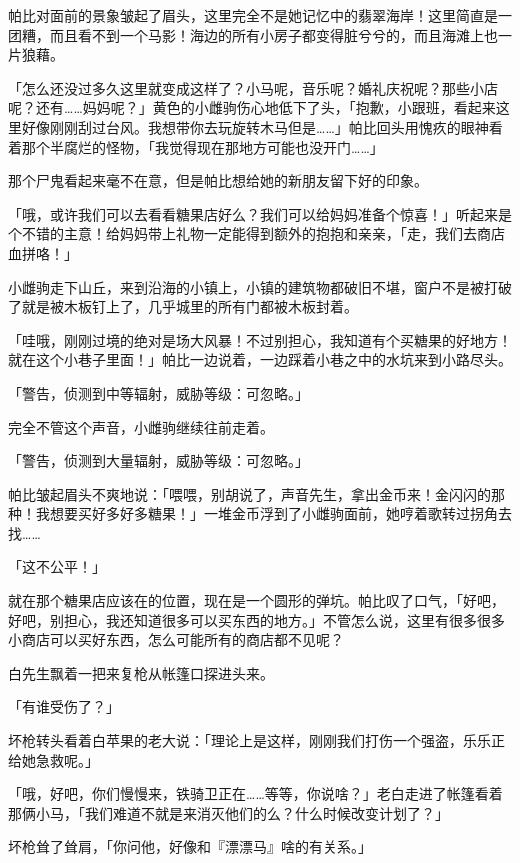 帕比对面前的景象皱起了眉头，这里完全不是她记忆中的翡翠海岸！这里简直是一团糟，而且看不到一个马影！海边的所有小房子都变得脏兮兮的，而且海滩上也一片狼藉。

「怎么还没过多久这里就变成这样了？小马呢，音乐呢？婚礼庆祝呢？那些小店呢？还有……妈妈呢？」黄色的小雌驹伤心地低下了头，「抱歉，小跟班，看起来这里好像刚刚刮过台风。我想带你去玩旋转木马但是……」帕比回头用愧疚的眼神看着那个半腐烂的怪物，「我觉得现在那地方可能也没开门……」

那个尸鬼看起来毫不在意，但是帕比想给她的新朋友留下好的印象。

「哦，或许我们可以去看看糖果店好么？我们可以给妈妈准备个惊喜！」听起来是个不错的主意！给妈妈带上礼物一定能得到额外的抱抱和亲亲，「走，我们去商店血拼咯！」

小雌驹走下山丘，来到沿海的小镇上，小镇的建筑物都破旧不堪，窗户不是被打破了就是被木板钉上了，几乎城里的所有门都被木板封着。

「哇哦，刚刚过境的绝对是场大风暴！不过别担心，我知道有个买糖果的好地方！就在这个小巷子里面！」帕比一边说着，一边踩着小巷之中的水坑来到小路尽头。

「{\mt 警告，侦测到中等辐射，威胁等级：可忽略。}」

完全不管这个声音，小雌驹继续往前走着。

「{\mt 警告，侦测到大量辐射，威胁等级：可忽略。}」

帕比皱起眉头不爽地说：「喂喂，别胡说了，声音先生，拿出金币来！金闪闪的那种！我想要买好多好多糖果！」一堆金币浮到了小雌驹面前，她哼着歌转过拐角去找……


「这不公平！」

就在那个糖果店应该在的位置，现在是一个圆形的弹坑。帕比叹了口气，「好吧，好吧，别担心，我还知道很多可以买东西的地方。」不管怎么说，这里有很多很多小商店可以买好东西，怎么可能所有的商店都不见呢？

\horizonline


白先生飘着一把来复枪从帐篷口探进头来。

「有谁受伤了？」

坏枪转头看着白苹果的老大说：「理论上是这样，刚刚我们打伤一个强盗，乐乐正给她急救呢。」

「哦，好吧，你们慢慢来，铁骑卫正在……等等，你说啥？」老白走进了帐篷看着那俩小马，「我们难道不就是来消灭他们的么？什么时候改变计划了？」

坏枪耸了耸肩，「你问他，好像和『漂漂马』啥的有关系。」

